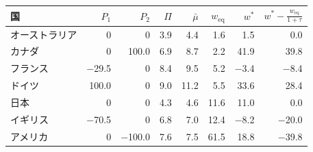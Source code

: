 \begin{tabular}{lrrrrrrr}
\toprule
国 & $P_{1}$ & $P_{2}$ & $\Pi$ & $\bar\mu$ & $w_{\mathrm{eq}}$ & $w^*$ & $w^* - \frac{w_{\mathrm{eq}}}{1+\tau}$ \\
\midrule
オーストラリア & 0 & 0 & 3.9 & 4.4 & 1.6 & 1.5 & 0.0 \\
カナダ & 0 & 100.0 & 6.9 & 8.7 & 2.2 & 41.9 & 39.8 \\
フランス & \ensuremath{-}29.5 & 0 & 8.4 & 9.5 & 5.2 & \ensuremath{-}3.4 & \ensuremath{-}8.4 \\
ドイツ & 100.0 & 0 & 9.0 & 11.2 & 5.5 & 33.6 & 28.4 \\
日本 & 0 & 0 & 4.3 & 4.6 & 11.6 & 11.0 & 0.0 \\
イギリス & \ensuremath{-}70.5 & 0 & 6.8 & 7.0 & 12.4 & \ensuremath{-}8.2 & \ensuremath{-}20.0 \\
アメリカ & 0 & \ensuremath{-}100.0 & 7.6 & 7.5 & 61.5 & 18.8 & \ensuremath{-}39.8 \\
\bottomrule
\end{tabular}
